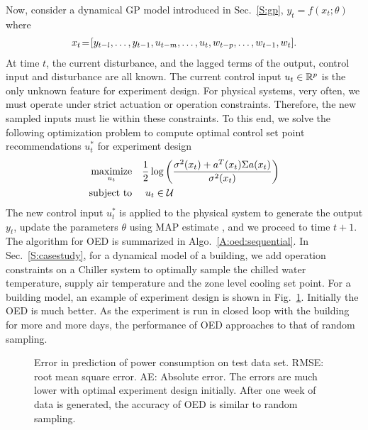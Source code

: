 Now, consider a dynamical GP model introduced in Sec.~\ref{S:gp},
\begin{math}
y_{t} = f(x_t;\theta)
\end{math}
where
\begin{align}
x_{t}\!=\![y_{t-l}, \dots, y_{t-1}, u_{t-m}, \dots, u_t, w_{t-p}, \dots, w_{t-1}, w_t] \text.
\label{E:GP:features}
\end{align}
At time \(t\), the current disturbance, and the lagged terms of the output, control input and disturbance are all known. The current control input \(u_t \in \mathbb{R}^p \) is the only unknown feature for experiment design. For physical systems, very often, we must operate under strict actuation or operation constraints. Therefore, the new sampled inputs must lie within these constraints. To this end, we solve the following optimization problem to compute optimal control set point recommendations \(u^*_t\) for experiment design
\begin{align}
\label{E:oed:sampling}
\maximize_{u_{t}} & \ \ \ \frac{1}{2}\log\left(\frac{\sigma^2(x_t)+a^T(x_t)\Sigma a(x_t)}{\sigma^2(x_t)}\right) \\
\st &  \ \ \ \   u_t \in \mathcal{U} \nonumber
\end{align}
The new control input \(u^*_t\) is applied to the physical system to generate the output \(y_t\), update the parameters \(\theta\) using MAP estimate \cite{Garnett2013}, and we proceed to time \(t+1\). 
The algorithm for OED is summarized in Algo.~\ref{A:oed:sequential}.
In Sec.~\ref{S:casestudy}, for a dynamical model of a building, we add operation constraints on a Chiller system to optimally sample the chilled water temperature, supply air temperature and the zone level cooling set point. For a building model, an example of experiment design is shown in Fig.~\ref{F:oed:example}. Initially the OED is much better. As the experiment is run in closed loop with the building for more and more days, the performance of OED approaches to that of random sampling. 

\begin{figure}[!tb]
  \centering
  \setlength{}
  \setlength{}	
  
  \caption{Error in prediction of power consumption on test data set. RMSE: root mean square error. AE: Absolute error. The errors are much lower with optimal experiment design initially. After one week of data is generated, the accuracy of OED is similar to random sampling.}
  \captionsetup{justification=centering}
  \label{F:oed:example}
\end{figure}


